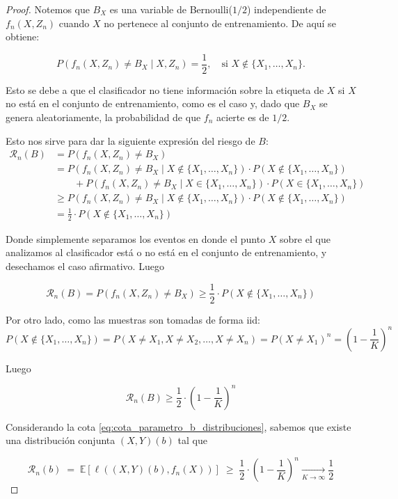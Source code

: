 \documentclass{article}
\begin{document}
\begin{proof}
Notemos que \(B_X\) es una variable de Bernoulli(\(1/2\)) independiente de \(f_n(X, Z_n)\) cuando 
\(X\) no pertenece al conjunto de entrenamiento. De aquí se obtiene:

\[
P(f_n(X, Z_n) \neq B_X \mid X, Z_n) = \frac{1}{2}, \quad \text{si } X \notin \{X_1, \dots, X_n\}.
\]

Esto se debe a que el clasificador no tiene información sobre la etiqueta de \(X\) si \(X\) no está en el conjunto de entrenamiento,
como es el caso y, dado que $B_X$ se genera aleatoriamente, la probabilidad de que $f_n$ acierte es de $1/2$. \newline

Esto nos sirve para
dar la siguiente expresión del riesgo de $B$:\newline
\begin{equation*}
    \begin{aligned}
        \mathcal{R}_n(B) &= P(f_n(X, Z_n) \neq B_X)\\
        &= P(f_n(X, Z_n) \neq B_X \mid X \notin \{X_1, \dots, X_n\}) \cdot P(X \notin \{X_1, \dots, X_n\})\\
        &  \qquad + P(f_n(X, Z_n) \neq B_X \mid X \in \{X_1, \dots, X_n\}) \cdot P(X \in \{X_1, \dots, X_n\})\\
        &\geq P(f_n(X, Z_n) \neq B_X \mid X \notin \{X_1, \dots, X_n\}) \cdot P(X \notin \{X_1, \dots, X_n\})\\
        & = \frac{1}{2} \cdot P(X \notin \{X_1, \dots, X_n\})
    \end{aligned}
\end{equation*}

Donde simplemente separamos los eventos en donde el punto $X$ sobre el que analizamos al clasificador está o no está
en el conjunto de entrenamiento, y desechamos el caso afirmativo. Luego

\[
\mathcal{R}_n(B) = P(f_n(X, Z_n) \neq B_X) \geq \frac{1}{2} \cdot P(X \notin \{X_1, \dots, X_n\})
\]

Por otro lado, como las muestras son tomadas de forma iid:
\[
    P(X \notin \{X_1, \dots, X_n\}) = P(X\neq X_1, X\neq X_2, \dots, X\neq X_n) = P(X\neq X_1)^n = \left(1-\frac{1}{K}\right)^n
\]

Luego

\[
\mathcal{R}_n(B) \geq \frac{1}{2} \cdot \left(1-\frac{1}{K}\right)^n
\]

Considerando la cota \ref{eq:cota_parametro_b_distribuciones}, sabemos que existe una distribución
conjunta $(X,Y)(b)$ tal que 

\[
\mathcal{R}_n(b) \; =\; \mathbb{E}[\ell((X,Y)(b),f_n(X))] \; \geq \;  \frac{1}{2} \cdot \left(1-\frac{1}{K}\right)^n \xrightarrow[K \to \infty]{} \frac{1}{2}
\]


\end{proof}
\end{document}
